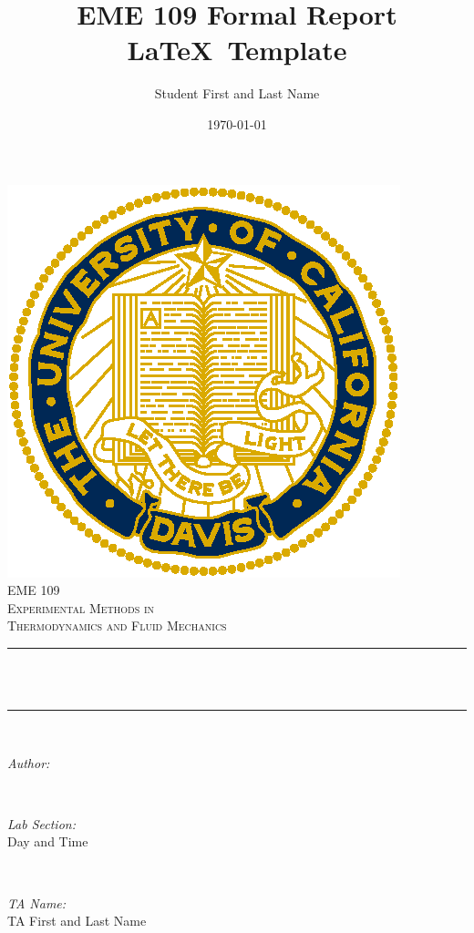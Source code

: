 \documentclass[12pt,letterpaper]{article}       %
\title{EME 109 Formal Report\\ \LaTeX\ Template}	%
\author{Student First and Last Name}				%
\date{\today}									    %
\makeatletter
\def\labSection{Day and Time}					    %
\def\thetaname{TA First and Last Name}				%
\let\thetitle\@title
\let\theauthor\@author
\makeatother
\begin{document}
\begin{titlepage}

	\centering
    \vspace*{0.5 cm}
    \includegraphics[scale = 1.0]{The_University_of_California_Davis}\\[1.0 cm]	%
	\textsc{\Large EME 109}\\[0.5 cm]				    %
	\textsc{\large Experimental Methods in\\ Thermodynamics and Fluid Mechanics}\\[0.5 cm]	%
	\rule{\linewidth}{0.2 mm} \\[0.4 cm]
	{ \huge \bfseries \thetitle}\\
	\rule{\linewidth}{0.2 mm} \\[1.5 cm]
	
	\begin{minipage}{0.4\textwidth}
		\begin{flushleft} \large
			\emph{Author:}\\
			\theauthor
		\end{flushleft}
	\end{minipage}~
	\begin{minipage}{0.4\textwidth}
		\begin{flushright} \large 
			\emph{Lab Section:} \\
			\labSection									
		\end{flushright}  
	\end{minipage}~\\[1 cm]
	\begin{minipage}{0.8\textwidth}
		\begin{flushleft} \large
			\emph{TA Name:}\\
			\thetaname
		\end{flushleft}
	\end{minipage}~\\[2 cm]


\end{titlepage}
\end{document}
